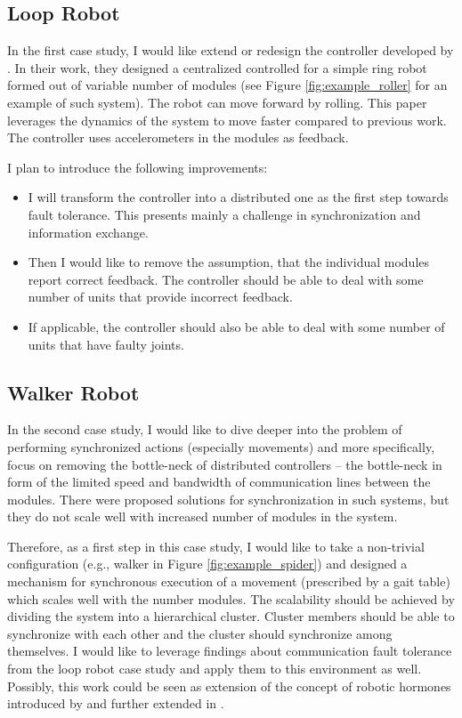 \subsection{Loop Robot}

In the first case study, I would like extend or redesign the controller
developed by \textcite{DBLP:journals/ijrr/SastraCY09}. In their work, they
designed a centralized controlled for a simple ring robot formed out of variable
number of modules (see Figure \ref{fig:example_roller} for an example of such
system). The robot can move forward by rolling. This paper leverages the
dynamics of the system to move faster compared to previous work. The controller
uses accelerometers in the modules as feedback.

I plan to introduce the following improvements:
\begin{itemize}
    \item I will transform the controller into a distributed one as the first
    step towards fault tolerance. This presents mainly a challenge in
    synchronization and information exchange.
    \item Then I would like to remove the assumption, that the individual
    modules report correct feedback. The controller should be able to deal with
    some number of units that provide incorrect feedback.
    \item If applicable, the controller should also be able to deal with some
    number of units that have faulty joints.
\end{itemize}

\subsection{Walker Robot}

In the second case study, I would like to dive deeper into the problem of
performing synchronized actions (especially movements) and more specifically,
focus on removing the bottle-neck of distributed controllers -- the bottle-neck
in form of the limited speed and bandwidth of communication lines between the
modules. There were proposed solutions for synchronization in such systems, but
they do not scale well with increased number of modules in the system.

Therefore, as a first step in this case study, I would like to take a
non-trivial configuration (e.g., walker in Figure \ref{fig:example_spider}) and
designed a mechanism for synchronous execution of a movement (prescribed by a
gait table) which scales well with the number modules. The scalability should be
achieved by dividing the system into a hierarchical cluster. Cluster members
should be able to synchronize with each other and the cluster should synchronize
among themselves. I would like to leverage findings about communication fault
tolerance from the loop robot case study and apply them to this environment as
well. Possibly, this work could be seen as extension of the concept of robotic
hormones introduced by \textcite{DBLP:conf/icra/SalemiSW01} and further extended
in \cite{DBLP:journals/trob/ShenSW02}.


